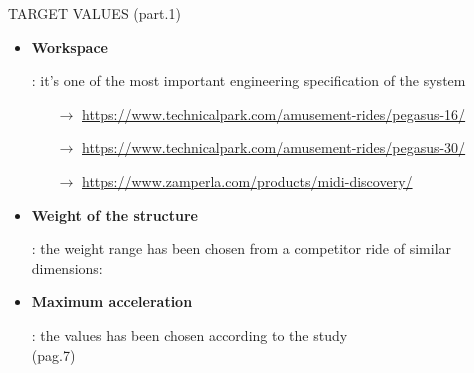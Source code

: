 \documentclass{beamer}              %
\begin{document}
	\begin{frame}[fragile]{TARGET VALUES (part.1)}		
		
		\begin{itemize}
			\small
			
			\item \hypertarget{1}{\textbf{Workspace}}: it's one of the most important engineering specification of the system
			
			\medskip
			
			\begin{itemize}
				\scriptsize
				\item[$\rightarrow$] \url{https://www.technicalpark.com/amusement-rides/pegasus-16/}
				\item[$\rightarrow$] \url{https://www.technicalpark.com/amusement-rides/pegasus-30/}
				\item[$\rightarrow$] \url{https://www.zamperla.com/products/midi-discovery/}
			\end{itemize}
			
			\medskip
			
			\item \hypertarget{2}{\textbf{Weight of the structure}}: the weight range has been chosen from a competitor ride of similar dimensions:
			
			\medskip
			
			\item \hypertarget{3}{\textbf{Maximum acceleration}}: the values has been chosen according to the study {\scriptsize {}} \\(pag.7)	
		\end{itemize}
	\end{frame}
\end{document}
